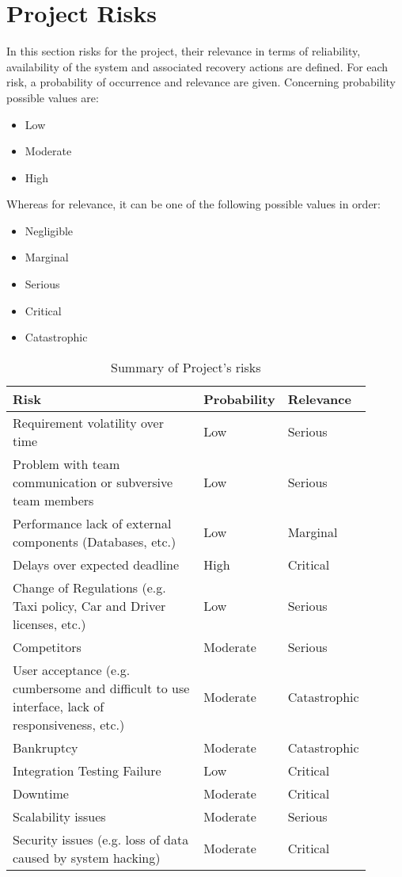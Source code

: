 \newpage
\section{Project Risks}
In this section risks for the project, their relevance in terms of reliability, availability of the system and associated recovery actions are defined.
For each risk, a probability of occurrence and relevance are given.
Concerning probability possible values are:
\begin{itemize}
	\item Low
	\item Moderate
	\item High
\end{itemize}
Whereas for relevance, it can be one of the following possible values in order:
\begin{itemize}
	\item Negligible
	\item Marginal
	\item Serious
	\item Critical
	\item Catastrophic
\end{itemize}
\begin{table}[H]
	\centering
	\begin{tabular}{p{0.6\linewidth}x{0.15\linewidth}x{0.15\linewidth}}
	\hline
	\textbf{Risk} & \textbf{Probability} & \textbf{Relevance} \\
	\hline
	Requirement volatility over time & Low & Serious \\
	Problem with team communication or subversive team members & Low & Serious \\
	Performance lack of external components (Databases, etc.) & Low & Marginal \\
	Delays over expected deadline & High & Critical \\ 
	Change of Regulations (e.g. Taxi policy, Car and Driver licenses, etc.) & Low & Serious \\
	Competitors & Moderate & Serious \\
	User acceptance (e.g. cumbersome and difficult to use interface, lack of responsiveness, etc.) & Moderate & Catastrophic \\
	Bankruptcy & Moderate & Catastrophic \\
	Integration Testing Failure & Low & Critical \\
	Downtime & Moderate & Critical \\
	Scalability issues & Moderate & Serious \\
	Security issues (e.g. loss of data caused by system hacking) & Moderate & Critical \\
	\hline
	\end{tabular}
	\caption{Summary of Project's risks}
\end{table} 
